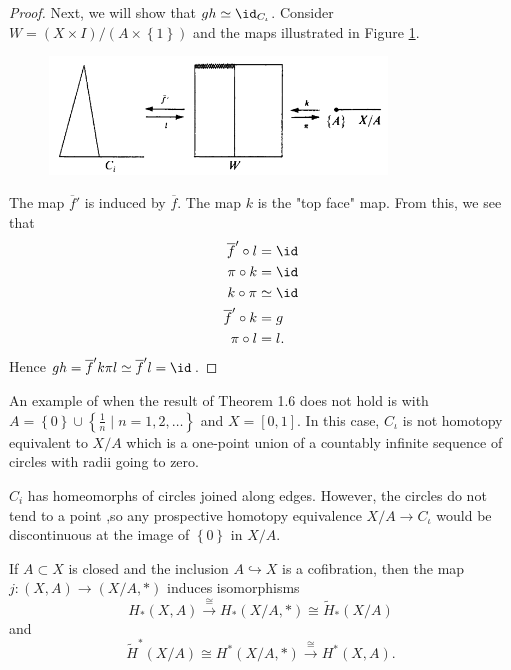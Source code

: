 \begin{proof}
    Next, we will show that $gh \simeq \id_{C_{\iota}}$.
    Consider $W = \left( X \times I \right) / 
    \left( A \times \left\{ 1 \right\}  \right) $ 
    and the maps illustrated in Figure \ref{fig:DWIJJXNXJNXJUI-png}.

    \begin{figure}[htpb]
        \centering
        \includegraphics[width=0.8\textwidth]{Figures/DWIJJXNXJNXJUI.png}
        \caption{}
        \label{fig:DWIJJXNXJNXJUI-png}
    \end{figure}
    The map $\overline{f}'$ is induced by
    $\overline{f}$. The map
    $k$ is the "top face" map.
    From this, we see that
    \begin{align*}
        \overline{f}' \circ l 
        &= \id \\
        \pi \circ k 
        &= \id \\
        k \circ \pi 
        &\simeq \id \\
        \overline{f}' \circ k
        &= g \\
        \pi \circ l 
        &= l.
    \end{align*}
   Hence $g h = \overline{f}' k \pi l 
   \simeq \overline{f}' l = \id$. 
\end{proof}


\begin{example}
    An example of when the result
    of Theorem 1.6 does not hold is with
    $A = \left\{ 0 \right\} \cup 
    \left\{ \frac{1}{n} \mid n = 1, 2, \ldots \right\} $ 
    and $X = \left[ 0,1 \right] $.
    In this case, $C_{\iota}$ is not homotopy equivalent
    to $X / A$ which is a one-point union of a countably infinite
    sequence of circles with radii going to zero.

    $C_i$ has homeomorphs of circles joined along edges. However,
    the circles do not tend to a point ,so any prospective homotopy
    equivalence $X / A \to C_{\iota}$ would be discontinuous at
    the image of $\left\{ 0 \right\} $ in $X / A$.
\end{example}

\begin{corollary}\label{Cor:Cofibration-Homology}
    If $A \subset X$ is closed and the inclusion
    $A \hookrightarrow X$ is a cofibration, then the map
    $j \colon \left( X, A \right) \to 
    \left( X / A, * \right) $ induces isomorphisms
    \[
    H_* (X,A) \stackrel{\cong}{\to} 
    H_* \left( X / A, * \right) 
    \cong \tilde{H}_* \left( X / A \right) 
    \] 
    and
    \[
    \tilde{H}^{*}(X /A) \cong
    H^{*} (X / A, *) 
    \stackrel{\cong}{\to} H^{*} (X , A).
    \] 
\end{corollary}

